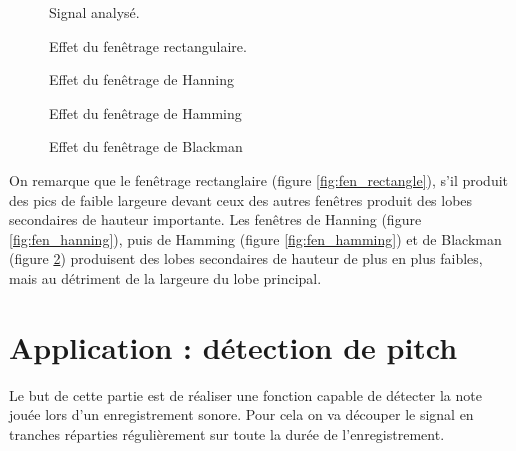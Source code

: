 \documentclass[french]{article}
\begin{document}
  
\begin{figure}[h!]
	\centering
	\begin{minipage}{\textwidth}
		\centering
		
		\caption{Signal analysé.}
		\label{fig:fen_signal}
	\end{minipage}
\end{figure}
\FloatBarrier
\begin{figure}[h!]
  	\begin{minipage}{\textwidth}
  		\centering
  		
  		\caption{Effet du fenêtrage rectangulaire.}
  		\label{fig:fen_rectangle}
  	\end{minipage}
  	\begin{minipage}{\textwidth}
  		\centering
  		
  		\caption{Effet du fenêtrage de Hanning}
  		\label{fig:fen_hanning}
	\end{minipage}
	\begin{minipage}{\textwidth}
		\centering
		
		\caption{Effet du fenêtrage de Hamming}
		\label{fig:fen_hamming}
	\end{minipage}
	\begin{minipage}{\textwidth}
		\centering
		
		\caption{Effet du fenêtrage de Blackman}
		\label{fig:fen_blackman}
	\end{minipage}
\end{figure}

On remarque que le fenêtrage rectanglaire (figure \ref{fig:fen_rectangle}), s'il produit des pics de faible largeure devant ceux des autres fenêtres produit des lobes secondaires de hauteur importante. Les fenêtres de Hanning (figure \ref{fig:fen_hanning}), puis de Hamming (figure \ref{fig:fen_hamming}) et de Blackman (figure \ref{fig:fen_blackman}) produisent des lobes secondaires de hauteur de plus en plus faibles, mais au détriment de la largeure du lobe principal.

\FloatBarrier
\clearpage
\part{Application : détection de pitch}

Le but de cette partie est de réaliser une fonction capable de détecter la note jouée lors d'un enregistrement sonore. Pour cela on va découper le signal en tranches réparties régulièrement sur toute la durée de l'enregistrement.
\end{document}
